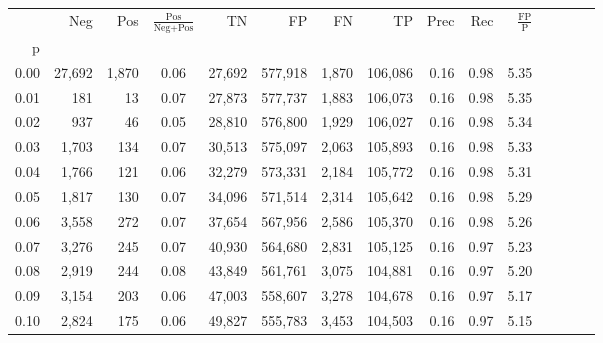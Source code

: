 \begin{tabular}{rrrcrrrrrrrrrrr}
\toprule
{} &     Neg &    Pos & $\frac{\text{Pos}}{\text{Neg}+\text{Pos}}$ &       TN &       FP &       FN &       TP &  Prec &   Rec & $\frac{\text{FP}}{\text{P}}$ \\
p    &         &        &                                            &          &          &          &          &       &       &                              \\
\midrule
0.00 &  27,692 &  1,870 &                                       0.06 &   27,692 &  577,918 &    1,870 &  106,086 &  0.16 &  0.98 &                         5.35 \\
0.01 &     181 &     13 &                                       0.07 &   27,873 &  577,737 &    1,883 &  106,073 &  0.16 &  0.98 &                         5.35 \\
0.02 &     937 &     46 &                                       0.05 &   28,810 &  576,800 &    1,929 &  106,027 &  0.16 &  0.98 &                         5.34 \\
0.03 &   1,703 &    134 &                                       0.07 &   30,513 &  575,097 &    2,063 &  105,893 &  0.16 &  0.98 &                         5.33 \\
0.04 &   1,766 &    121 &                                       0.06 &   32,279 &  573,331 &    2,184 &  105,772 &  0.16 &  0.98 &                         5.31 \\
0.05 &   1,817 &    130 &                                       0.07 &   34,096 &  571,514 &    2,314 &  105,642 &  0.16 &  0.98 &                         5.29 \\
0.06 &   3,558 &    272 &                                       0.07 &   37,654 &  567,956 &    2,586 &  105,370 &  0.16 &  0.98 &                         5.26 \\
0.07 &   3,276 &    245 &                                       0.07 &   40,930 &  564,680 &    2,831 &  105,125 &  0.16 &  0.97 &                         5.23 \\
0.08 &   2,919 &    244 &                                       0.08 &   43,849 &  561,761 &    3,075 &  104,881 &  0.16 &  0.97 &                         5.20 \\
0.09 &   3,154 &    203 &                                       0.06 &   47,003 &  558,607 &    3,278 &  104,678 &  0.16 &  0.97 &                         5.17 \\
0.10 &   2,824 &    175 &                                       0.06 &   49,827 &  555,783 &    3,453 &  104,503 &  0.16 &  0.97 &                         5.15 \\

\end{tabular}
